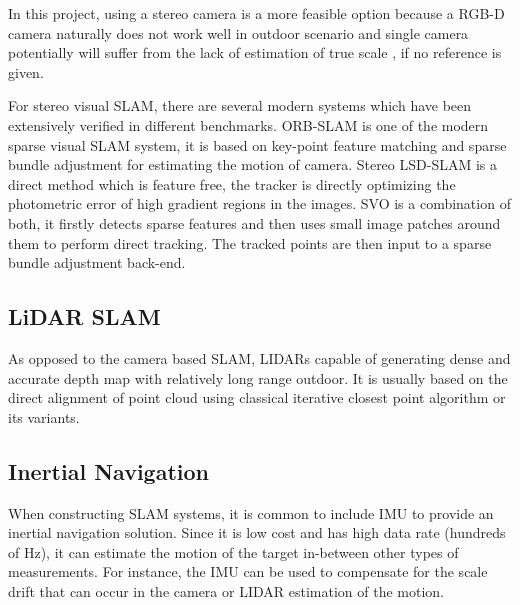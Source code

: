 In this project, using a stereo camera is a more feasible option
because a RGB-D camera naturally does not work well in outdoor scenario
and single camera potentially will suffer from the lack of estimation
of true scale \cite{Royer2007}, if no reference is given.

For stereo visual \gls{SLAM}, there are several modern systems
which have been extensively verified in different
benchmarks. \gls{ORB}-\gls{SLAM}\cite{DBLP:journals/corr/Mur-ArtalT16a} is one
of the modern sparse visual \gls{SLAM}
system, it is based on key-point feature matching and sparse bundle
adjustment for estimating the motion of camera. Stereo \gls{LSD}-\gls{SLAM}\cite{7353631} is
a direct method which is feature free, the tracker is directly
optimizing the photometric error of  high gradient regions in the
images. \gls{SVO}\cite{7782863} is a combination of both, it firstly detects sparse
features and then uses small image patches around them to perform
direct tracking. The tracked points are then input to a sparse bundle
adjustment back-end.

\subsection{LiDAR SLAM}

As opposed to the camera based \gls{SLAM}, \gls{LIDAR}s capable
of generating dense and accurate depth map with relatively long range
outdoor\cite{7487258}. It is usually based on the direct alignment of point cloud
using classical iterative closest point algorithm or its variants.

\subsection{Inertial Navigation}

When constructing \gls{SLAM} systems, it is common to include \gls{IMU} to
provide an inertial navigation solution. Since it is low
cost and has high data rate (hundreds of Hz), it can estimate the motion of the
target in-between other types of measurements. For instance, the \gls{IMU} can
be used to compensate for the scale drift that can occur in the camera or
\gls{LIDAR} estimation of the motion.





